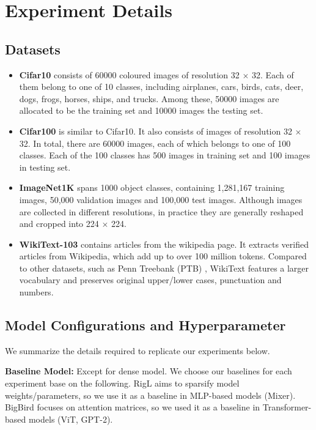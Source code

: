 \section{Experiment Details}
\label{sec:experiment_details}
\subsection{Datasets}
\begin{itemize}
    \item \textbf{Cifar10} \citep{krizhevsky2009learning} consists of 60000 coloured images of resolution 32 $\times$ 32. Each of them belong to one of 10 classes, including airplanes, cars, birds, cats, deer, dogs, frogs, horses, ships, and trucks. Among these, 50000 images are allocated to be the training set and 10000 images the testing set.
    \item \textbf{Cifar100} \citep{krizhevsky2009learning} is similar to Cifar10. It also consists of images of resolution 32 $\times$ 32. In total, there are 60000 images, each of which belongs to one of 100 classes. Each of the 100 classes has 500 images in training set and 100 images in testing set.
    \item \textbf{ImageNet1K} \citep{russakovsky2015imagenet} spans 1000 object classes, containing 1,281,167 training images, 50,000 validation images and 100,000 test images. Although images are collected in different resolutions, in practice they are generally reshaped and cropped into 224 $\times$ 224.
    \item \textbf{WikiText-103} \citep{merity2016pointer} contains articles from the wikipedia page. It extracts verified articles from Wikipedia, which add up to over 100 million tokens. Compared to other datasets, such as Penn Treebank (PTB) \citep{taylor2003penn}, WikiText features a larger vocabulary and preserves original upper/lower cases, punctuation and numbers.
    
    
\end{itemize}
\subsection{Model Configurations and Hyperparameter}



We summarize the details required to replicate our experiments below.

\textbf{Baseline Model:} Except for dense model. We choose our baselines for each experiment base on the following. RigL aims to sparsify model weights/parameters, so we use it as a baseline in MLP-based models (Mixer). BigBird focuses on attention matrices, so we used it as a baseline in Transformer-based models (ViT, GPT-2).

